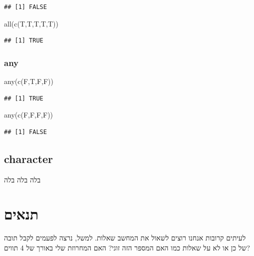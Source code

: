 \documentclass[
]{book}
\newenvironment{Shaded}{\begin{snugshade}}{\end{snugshade}}
\newcommand{\FunctionTok}[1]{\textcolor[rgb]{0.00,0.00,0.00}{#1}}
\newcommand{\NormalTok}[1]{#1}
\begin{document}
\begin{verbatim}
## [1] FALSE
\end{verbatim}

\begin{Shaded}
\begin{Highlighting}[]
\FunctionTok{all}\NormalTok{(}\FunctionTok{c}\NormalTok{(T,T,T,T,T))}
\end{Highlighting}
\end{Shaded}

\begin{verbatim}
## [1] TRUE
\end{verbatim}

\hypertarget{any}{%
\subsection{any}\label{any}}

\begin{Shaded}
\begin{Highlighting}[]
\FunctionTok{any}\NormalTok{(}\FunctionTok{c}\NormalTok{(F,T,F,F))}
\end{Highlighting}
\end{Shaded}

\begin{verbatim}
## [1] TRUE
\end{verbatim}

\begin{Shaded}
\begin{Highlighting}[]
\FunctionTok{any}\NormalTok{(}\FunctionTok{c}\NormalTok{(F,F,F,F))}
\end{Highlighting}
\end{Shaded}

\begin{verbatim}
## [1] FALSE
\end{verbatim}

\hypertarget{character}{%
\section{character}\label{character}}

בלה בלה בלה

\hypertarget{ux5eaux5e0ux5d0ux5d9ux5dd}{%
\chapter{תנאים}\label{ux5eaux5e0ux5d0ux5d9ux5dd}}

לעיתים קרובות אנחנו רוצים לשאול את המחשב שאלות. למשל, נרצה לפעמים לקבל תובה של כן או לא על שאלות כמו האם המספר הזה זוגי? האם המחרוזת שלי באורך של 4 תווים?
\end{document}
